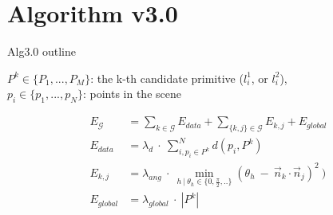 \documentclass[11pt,a3paper]{article}
\begin{document}
\pagebreak
\section{Algorithm v3.0}
\begin{algorithm}[H]
 \caption{Alg3.0 outline}
\end{algorithm}

\noindent $P^k \in \{P_1,..., P_M\}$: the k-th candidate primitive ($l_i^1$, or $l_i^2$), \\ 
$p_i \in \{ p_1, ..., p_N \}$: points in the scene

\begin{align}
	E_{\mathcal{G}} &= \sum_{k \in \mathcal{G}} {E_{data}} 
				 	 + \sum_{\{k,j\} \in \mathcal{G}}{E_{k,j}}
				 	 + E_{global}
				 	 \label{eq:e_graph3}
	\\
%
	E_{data} &= 
		\lambda_{d} ~\cdot~ \sum_{i, p_i \in P^k }^N d(p_i,P^k)  \label{eq:e_dist3} 
	\\
%
	E_{k,j} &= 
		\lambda_{ang} ~\cdot~ \min_{h ~|~ \theta_h \in \{0,\frac{\pi}{2},..\}} 
		(\theta_h ~-~ \vec{n}_k \cdot \vec{n}_j)^2 ~)  \label{eq:e_angle3} \\
%
	E_{global} &= \lambda_{global} ~\cdot~ |P^k| \label{eq:e_clique_size3}
%
\end{align}
\end{document}
